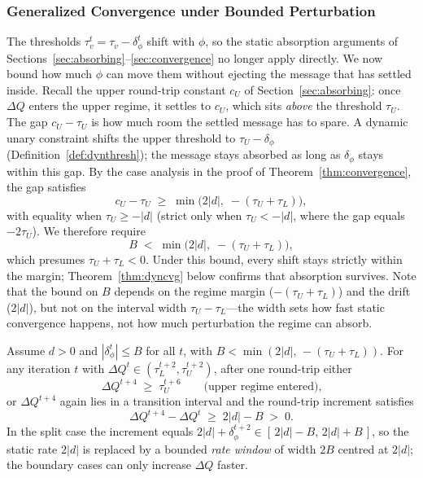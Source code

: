 \subsubsection{Generalized Convergence under Bounded Perturbation}\label{subsec:gencvg}
The thresholds $\tau_v^t = \tau_v - \delta^t_\phi$ shift with $\phi$, so the static absorption arguments of Sections~\ref{sec:absorbing}--\ref{sec:convergence} no longer apply directly.  We now bound how much $\phi$ can move them without ejecting the message that has settled inside.
Recall the upper round-trip constant $c_U$ of Section~\ref{sec:absorbing}: once $\Delta Q$ enters the upper regime, it settles to $c_U$, which sits \emph{above} the threshold $\tau_U$.  The gap $c_U - \tau_U$ is how much room the settled message has to spare.  A dynamic unary constraint shifts the upper threshold to $\tau_U - \delta_\phi$ (Definition~\ref{def:dynthresh}); the message stays absorbed as long as $\delta_\phi$ stays within this gap.
By the case analysis in the proof of Theorem~\ref{thm:convergence}, the gap satisfies
\[
    c_U - \tau_U \;\geq\; \min\!\bigl(2|d|,\; -(\tau_U+\tau_L)\bigr),
\]
with equality when $\tau_U \geq -|d|$ (strict only when $\tau_U < -|d|$, where the gap equals $-2\tau_U$).  We therefore require
\[
    B \;<\; \min\!\bigl(2|d|,\; -(\tau_U + \tau_L)\bigr),
\]
which presumes $\tau_U + \tau_L < 0$.  Under this bound, every shift stays strictly within the margin; Theorem~\ref{thm:dyncvg} below confirms that absorption survives.
Note that the bound on $B$ depends on the regime margin ($-(\tau_U + \tau_L)$) and the drift ($2|d|$), but not on the interval width $\tau_U - \tau_L$---the width sets how fast static convergence happens, not how much perturbation the regime can absorb.
\begin{lemma}\label{lem:dyndrift}
Assume $d > 0$ and $|\delta^t_\phi| \leq B$ for all $t$, with $B < \min(2|d|,\,-(\tau_U+\tau_L))$.  For any iteration $t$ with $\Delta Q^t \in (\tau_L^{t+2}, \tau_U^{t+2})$, after one round-trip either
\[
    \Delta Q^{t+4} \;\geq\; \tau_U^{t+6} \qquad\text{(upper regime entered),}
\]
or $\Delta Q^{t+4}$ again lies in a transition interval and the round-trip increment satisfies
\[
    \Delta Q^{t+4} - \Delta Q^t \;\geq\; 2|d| - B \;>\; 0 .
\]
In the split case the increment equals $2|d| + \delta^{t+2}_\phi \in [\,2|d|-B,\,2|d|+B\,]$, so the static rate $2|d|$ is replaced by a bounded \emph{rate window} of width $2B$ centred at $2|d|$; the boundary cases can only increase $\Delta Q$ faster.
\end{lemma}
